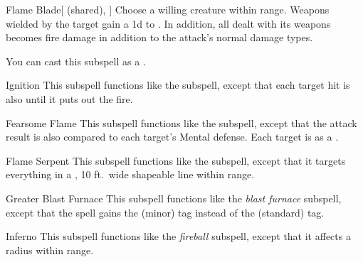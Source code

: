 \begin{ability}[\nth{3}]{Flame Blade}[ (shared), ]
Choose a willing creature within \rngclose range.
Weapons wielded by the target gain a \plus1d  to .
In addition, all  dealt with its weapons becomes fire damage in addition to the attack's normal damage types.

You can cast this subspell as a .
\end{ability}
\vspace{0.25em}


\begin{ability}[\nth{3}]{Ignition}
This subspell functions like the  subspell, except that each target hit is also  until it puts out the fire.
\end{ability}
\vspace{0.25em}


\begin{ability}[\nth{4}]{Fearsome Flame}
This subspell functions like the  subspell, except that the attack result is also compared to each target's Mental defense.
\hit Each target is  as a .
\end{ability}
\vspace{0.25em}


\begin{ability}[\nth{4}]{Flame Serpent}
This subspell functions like the  subspell, except that it targets everything in a \arealarge, 10 ft.\ wide shapeable line within \rngmed range.
\end{ability}
\vspace{0.25em}


\begin{ability}[\nth{5}]{Greater Blast Furnace}
This subspell functions like the \textit{blast furnace} subspell, except that the spell gains the  (minor) tag instead of the  (standard) tag.
\end{ability}
\vspace{0.25em}


\begin{ability}[\nth{5}]{Inferno}
This subspell functions like the \textit{fireball} subspell, except that it affects a \arealarge radius within \rngmed range.
\end{ability}
\vspace{0.25em}



